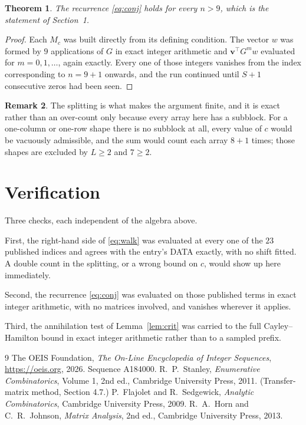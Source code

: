 \documentclass[11pt,a4paper]{article}
\theoremstyle{plain}
\newtheorem{theorem}{Theorem}
\theoremstyle{definition}
\newtheorem{remark}[theorem]{Remark}
\begin{document}
\begin{theorem}
The recurrence \eqref{eq:conj} holds for every $n>9$, which is the statement of
Section~1.
\end{theorem}

\begin{proof}
Each $M_c$ was built directly from its defining condition. The vector $w$ was formed by
$9$ applications of $G$ in exact integer arithmetic and $\mathbf{v}^{\!\top}G^{m}w$
evaluated for $m=0,1,\dots$, again exactly. Every one of those integers vanishes from the
index corresponding to $n=9+1$ onwards, and the run continued until $S+1$ consecutive
zeros had been seen.
\end{proof}

\begin{remark}
The splitting is what makes the argument finite, and it is exact rather than an
over-count only because every array here has a subblock. For a one-column or one-row
shape there is no subblock at all, every value of $c$ would be vacuously admissible, and the
sum would count each array $8+1$ times; those shapes are excluded by $L\ge2$ and
$7\ge2$.
\end{remark}

\section{Verification}

Three checks, each independent of the algebra above.

First, the right-hand side of \eqref{eq:walk} was evaluated at every one of the $23$
published indices and agrees with the entry's DATA exactly, with no shift fitted. A double
count in the splitting, or a wrong bound on $c$, would show up here immediately.

Second, the recurrence \eqref{eq:conj} was evaluated on those published terms in exact
integer arithmetic, with no matrices involved, and vanishes wherever it applies.

Third, the annihilation test of Lemma~\ref{lem:crit} was carried to the full
Cayley--Hamilton bound in exact integer arithmetic rather than to a sampled prefix.

\begin{thebibliography}{9}
 The OEIS Foundation, \emph{The On-Line Encyclopedia of Integer
Sequences}, \url{https://oeis.org}, 2026. Sequence A184000.
 R.~P.~Stanley, \emph{Enumerative Combinatorics}, Volume 1, 2nd ed.,
Cambridge University Press, 2011. (Transfer-matrix method, Section 4.7.)
 P.~Flajolet and R.~Sedgewick, \emph{Analytic Combinatorics}, Cambridge
University Press, 2009.
 R.~A.~Horn and C.~R.~Johnson, \emph{Matrix Analysis}, 2nd ed., Cambridge
University Press, 2013.
\end{thebibliography}
\end{document}
